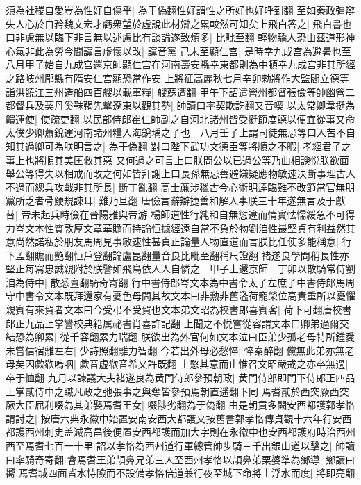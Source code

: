 須為社稷自愛豈為性好自傷乎|{
	為于偽翻性好謂性之所好也好呼到翻}
至如秦政彊辯失人心於自矜魏文宏才虧衆望於虛說此材辯之累較然可知矣上飛白答之|{
	飛白書也}
曰非慮無以臨下非言無以述慮比有談論遂致煩多|{
	比毗至翻}
輕物驕人恐由茲道形神心氣非此為勞今聞讜言虛懷以改|{
	讜音黨}
己未至顯仁宫|{
	是時幸九成宫為避暑也至八月甲子始自九成宫還京師顯仁宫在河南壽安縣幸東都則為中頓幸九成宫非其所經之路岐州郿縣有隋安仁宫顯恐當作安}
上將征高麗秋七月辛卯勑將作大監閻立德等詣洪饒江三州造船四百艘以載軍糧|{
	艘蘇遭翻}
甲午下詔遣營州都督張儉等帥幽營二都督兵及契丹奚靺鞨先擊遼東以觀其勢|{
	帥讀曰率契欺訖翻又音喫}
以太常卿韋挺為饋運使|{
	使疏吏翻}
以民部侍郎崔仁師副之自河北諸州皆受挺節度聼以便宜從事又命太僕少卿蕭銳運河南諸州糧入海銳瑀之子也　八月壬子上謂司徒無忌等曰人苦不自知其過卿可為朕明言之|{
	為于偽翻}
對曰陛下武功文德臣等將順之不暇|{
	孝經君子之事上也將順其美匡救其惡}
又何過之可言上曰朕問公以已過公等乃曲相諛悦朕欲面舉公等得失以相戒而改之何如皆拜謝上曰長孫無忌善避嫌疑應物敏速决斷事理古人不過而總兵攻戰非其所長|{
	斷丁亂翻}
高士亷涉獵古今心術明逹臨難不改節當官無朋黨所乏者骨鯁規諫耳|{
	難乃旦翻}
唐儉言辭辯捷善和解人事朕三十年遂無言及于獻替|{
	帝未起兵時儉在晉陽雅與帝游}
楊師道性行純和自無愆違而情實怯懦緩急不可得力岑文本性質敦厚文章華贍而持論恒據經遠自當不負於物劉洎性最堅貞有利益然其意尚然諾私於朋友馬周見事敏速性甚貞正論量人物直道而言朕比任使多能稱意|{
	行下孟翻贍而艷翻恒戶登翻論盧昆翻量音良比毗至翻稱尺證翻}
禇遂良學問稍長性亦堅正每寫忠誠親附於朕譬如飛鳥依人人自憐之　甲子上還京師　丁卯以散騎常侍劉洎為侍中|{
	散悉亶翻騎奇寄翻}
行中書侍郎岑文本為中書令太子左庶子中書侍郎馬周守中書令文本既拜還家有憂色母問其故文本曰非勲非舊濫荷寵榮位高責重所以憂懼親賓有來賀者文本曰今受弔不受賀也文本弟文昭為校書郎喜賓客|{
	荷下可翻唐校書郎正九品上掌讐校典籍属祕書肖喜許記翻}
上聞之不悦嘗從容謂文本曰卿弟過爾交結恐為卿累|{
	從千容翻累力瑞翻}
朕欲出為外官何如文本泣曰臣弟少孤老母特所鍾愛未嘗信宿離左右|{
	少詩照翻離力智翻}
今若出外母必愁悴|{
	悴秦醉翻}
儻無此弟亦無老母矣因歔欷嗚咽|{
	歔音虚欷音希又許既翻}
上愍其意而止惟召文昭嚴戒之亦卒無過|{
	卒于恤翻}
九月以諫議大夫褚遂良為黄門侍郎參預朝政|{
	黄門侍郎即門下侍郎正四品上掌貳侍中之職凡政之弛張事之與奪皆參預焉朝直遥翻下同}
焉耆貳於西突厥西突厥大臣屈利啜為其弟娶焉耆王女|{
	啜陟劣翻為于偽翻}
由是朝貢多闕安西都護郭孝恪請討之|{
	按唐六典永徽中始置安南安西大都護又按舊書郭孝恪傳貞觀十六年行安西都護西州刺史盖滅高昌後便置安西都護而加大字則在永徽中也安西都護府時治西州西至焉耆七百一十里}
詔以孝恪為西州道行軍總管帥步騎三千出銀山道以擊之|{
	帥讀曰率騎奇寄翻}
會焉耆王弟頡鼻兄弟三人至西州孝恪以頡鼻弟栗婆準為鄉導|{
	鄉讀曰嚮}
焉耆城四面皆水恃險而不設備孝恪倍道兼行夜至城下命將士浮水而度|{
	將即亮翻}
